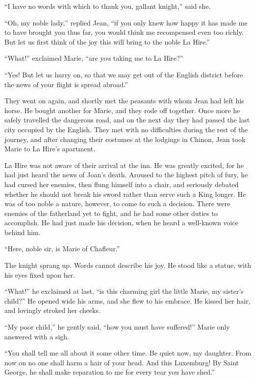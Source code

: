 ``I have no words with which to thank you, gallant knight,'' said she.

``Oh, my noble lady,'' replied Jean, ``if you only knew how happy it has
made me to have brought you thus far, you would think me recompensed
even too richly. But let us first think of the joy this will bring to
the noble La Hire.''

``What!'' exclaimed Marie, ``are you taking me to La Hire?''

``Yes! But let us hurry on, so that we may get out of the English
district before the news of your flight is spread abroad.''

They went on again, and shortly met the peasants with whom Jean had left
his horse. He bought another for Marie, and they rode off together. Once
more he safely travelled the dangerous road, and on the next day they
had passed the last city occupied by the English. They met with no
difficulties during the rest of the journey, and after changing their
costumes at the lodgings in Chinon, Jean took Marie to La Hire's
apartment.

La Hire was not aware of their arrival at the inn. He was greatly
excited, for he had just heard the news of Joan's death. Aroused to the
highest pitch of fury, he had cursed her enemies, then flung himself
into a chair, and seriously debated whether he should not break his
sword rather than serve such a King longer. He was of too noble a
nature, however, to come to such a decision. There were enemies of the
fatherland yet to fight, and he had some other duties to accomplish. He
had just made his decision, when he heard a well-known voice behind him.

``Here, noble sir, is Marie of Chafleur.''

The knight sprang up. Words cannot describe his joy. He stood like a
statue, with his eyes fixed upon her.

``What!'' he exclaimed at last, ``is this charming girl the little
Marie, my sister's child?'' He opened wide his arms, and she flew to his
embrace. He kissed her hair, and lovingly stroked her cheeks.

``My poor child,'' he gently said, ``how you must have suffered!'' Marie
only answered with a sigh.

``You shall tell me all about it some other time. Be quiet now, my
daughter. From now on no one shall harm a hair of your head. And this
Luxemburg! By Saint George, he shall make reparation to me for every
tear you have shed.''

